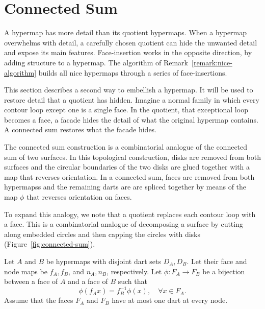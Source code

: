 \section{Connected Sum}\label{sec:csum}

A hypermap has more detail than its quotient hypermaps.
When a hypermap overwhelms with detail, a carefully chosen
quotient can hide the unwanted detail and expose its main features.
Face-insertion works in the opposite direction,
by adding structure to a hypermap.
The algorithm of Remark~\ref{remark:nice-algorithm}
builds all nice hypermaps through a series of face-insertions.

This section describes a second way to embellish
a hypermap.  It will be used to restore detail that
a quotient has hidden.  Imagine a normal family in which every
contour loop except one is a single face.  In the quotient, that
exceptional loop becomes a face, a facade hides the detail of what
the original hypermap contains.  A connected sum 
restores what the facade
hides.


The connected sum construction is a combinatorial analogue of
the connected sum of two surfaces.  In this topological construction,
disks are removed from both surfaces and the circular boundaries
of the two disks are glued together with a map that reverses orientation.
In a connected sum, faces are removed
from both hypermapss and the remaining darts are
are spliced together by means of the
map $\phi$ that reverses orientation on faces.  

To expand this analogy, 
we note that a quotient replaces each contour loop with a face.  This
is a combinatorial analogue of decomposing a surface by cutting
along 
embedded circles and then capping the circles with disks
(Figure~\ref{fig:connected-sum}).


Let $A$ and $B$ be hypermaps with disjoint dart sets $D_A, D_B$.
Let their 
face and node
maps be
    $f_A,f_B$, and $n_A,n_B$, respectively.
Let $\phi:F_A\to F_B$ be a bijection between a face of $A$ and a
face of $B$ such that
    $$
    \phi(f_A x) = f_B^{-1}\phi(x),\quad \forall
    x\in F_A.
    $$
Assume that the faces $F_A$ and $F_B$ have at most one dart at
every node.

